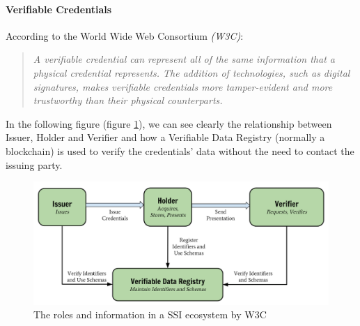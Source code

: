 \documentclass[a4paper, 12pt]{article} %
\begin{document}
                \paragraph{Verifiable Credentials}
                    According to the World Wide Web Consortium \textit{(W3C)}\cite{w3c-vc}:
                    \begin{quote}
                        \textit{A verifiable credential can represent all of the same information that a physical credential represents. The addition of technologies, such as digital signatures, makes verifiable credentials more tamper-evident and more trustworthy than their physical counterparts.}
                    \end{quote}
                    In the following figure (figure \ref{fig:ssi-vc}), we can see clearly the relationship between Issuer, Holder and Verifier and how a Verifiable Data Registry (normally a blockchain) is used to verify the credentials’ data without the need to contact the issuing party.
                    \begin{figure}[h]
                        \centering
                        \includegraphics[width=1.0\textwidth]{ssi-vc.png}
                        \caption{The roles and information in a SSI ecosystem by W3C}
                        \label{fig:ssi-vc}
                    \end{figure}
                
\end{document}
